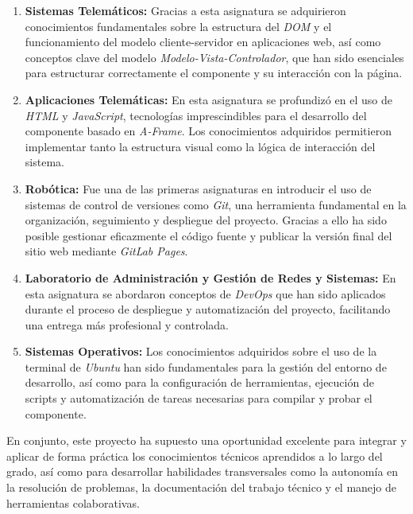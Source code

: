 \documentclass[a4paper, 12pt]{book}
\begin{document}
\begin{enumerate}
  \item \textbf{Sistemas Telemáticos:} Gracias a esta asignatura se adquirieron conocimientos fundamentales sobre la estructura del \textit{DOM} y el funcionamiento del modelo cliente-servidor en aplicaciones web, así como conceptos clave del modelo \textit{Modelo-Vista-Controlador}, que han sido esenciales para estructurar correctamente el componente y su interacción con la página.

  \item \textbf{Aplicaciones Telemáticas:} En esta asignatura se profundizó en el uso de \textit{HTML} y \textit{JavaScript}, tecnologías imprescindibles para el desarrollo del componente basado en \textit{A-Frame}. Los conocimientos adquiridos permitieron implementar tanto la estructura visual como la lógica de interacción del sistema.

  \item \textbf{Robótica:} Fue una de las primeras asignaturas en introducir el uso de sistemas de control de versiones como \textit{Git}, una herramienta fundamental en la organización, seguimiento y despliegue del proyecto. Gracias a ello ha sido posible gestionar eficazmente el código fuente y publicar la versión final del sitio web mediante \textit{GitLab Pages}.

  \item \textbf{Laboratorio de Administración y Gestión de Redes y Sistemas:} En esta asignatura se abordaron conceptos de \textit{DevOps} que han sido aplicados durante el proceso de despliegue y automatización del proyecto, facilitando una entrega más profesional y controlada.

  \item \textbf{Sistemas Operativos:} Los conocimientos adquiridos sobre el uso de la terminal de \textit{Ubuntu} han sido fundamentales para la gestión del entorno de desarrollo, así como para la configuración de herramientas, ejecución de scripts y automatización de tareas necesarias para compilar y probar el componente.
\end{enumerate}

En conjunto, este proyecto ha supuesto una oportunidad excelente para integrar y aplicar de forma práctica los conocimientos técnicos aprendidos a lo largo del grado, así como para desarrollar habilidades transversales como la autonomía en la resolución de problemas, la documentación del trabajo técnico y el manejo de herramientas colaborativas.
\end{document}
